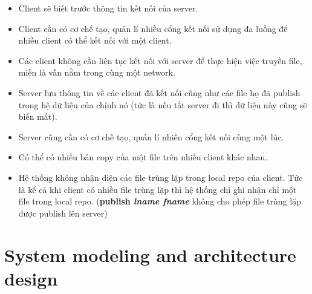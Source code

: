 \documentclass[a4paper]{article}
\begin{document}
\begin{itemize}
		\item Client sẽ biết trước thông tin kết nối của server.
		\item Client cần có cơ chế tạo, quản lí nhiều cổng kết nối sử dụng đa luồng để nhiều client có thể kết nối với một client.
		\item Các client không cần liên tục kết nối với server để thực hiện việc truyền file, miễn là vẫn nằm trong cùng một network.
		\item Server lưu thông tin về các client đã kết nối cũng như các file họ đã publish trong hệ dữ liệu của chính nó (tức là nếu tắt server đi thì dữ liệu này cũng sẽ biến mất).
		\item Server cũng cần có cơ chế tạo, quản lí nhiều cổng kết nối cùng một lúc.
		\item Có thể có nhiều bản copy của một file trên nhiều client khác nhau. 
		\item Hệ thống không nhận diện các file trùng lặp trong local repo của client. Tức là kể cả khi client có nhiều file trùng lặp thì hệ thống chỉ ghi nhận chỉ một file trong local repo. (\textbf{publish \textit{lname fname}} không cho phép file trùng lặp được publish lên server)
	\end{itemize}
	
	\section{System modeling and architecture design}
\end{document}
